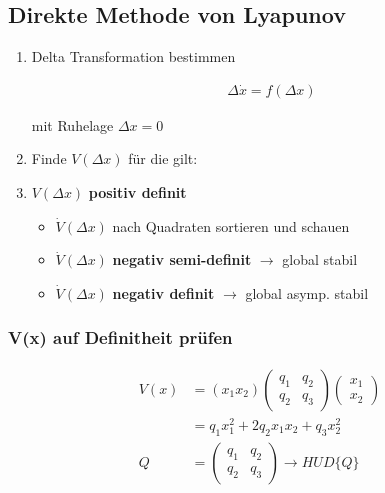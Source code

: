 \documentclass[10pt,a4paper]{article}
\begin{document}
  \subsection{Direkte Methode von Lyapunov}
  \begin{enumerate}
    \item Delta Transformation bestimmen
  \begin{mdframed}[style=exercise]
    \begin{align}
        \Delta \dot{x} = f (\Delta x)
    \end{align}
  \end{mdframed}
  mit Ruhelage $\Delta x = 0$
    \item Finde $V(\Delta x)$ für die gilt:
    \item $V(\Delta x)$ \textbf{positiv definit}
        \begin{itemize}
            \item $\dot{V}(\Delta x)$ nach Quadraten sortieren und schauen
            \item $\dot{V}(\Delta x)$ \textbf{negativ semi-definit} $\rightarrow$ global stabil 
            \item $\dot{V}(\Delta x)$ \textbf{negativ definit} $\rightarrow$ global asymp. stabil 
        \end{itemize}
  \end{enumerate}

  \subsubsection{V(x) auf Definitheit prüfen}
  \begin{mdframed}[style=exercise]
    \begin{align}
        V(x) &= (x_1 x_2)
        \begin{pmatrix}
            q_1 & q_2 \\
            q_2 & q_3
        \end{pmatrix} 
        \begin{pmatrix}
            x_1 \\
            x_2
        \end{pmatrix} \\
        &= q_1 x_1^2 + 2q_2 x_1 x_2 + q_3 x_2^2 \\
        Q &= 
        \begin{pmatrix}
            q_1 & q_2 \\
            q_2 & q_3
        \end{pmatrix} \rightarrow HUD\{Q\}
    \end{align}
  \end{mdframed}
\end{document}
